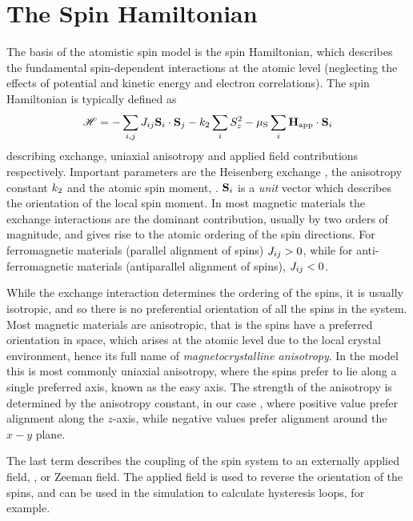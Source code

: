 \section*{The Spin Hamiltonian}
The basis of the atomistic spin model is the spin Hamiltonian, which describes the fundamental spin-dependent interactions at the atomic level (neglecting the effects of potential and kinetic energy and electron correlations). The spin Hamiltonian is typically defined as 
\begin{equation*}
\mathscr{H} = - \sum_{i,j} J_{ij} \mathbf{S}_i \cdot \mathbf{S}_j - k_{2} \sum_{i} S_z^2 - \mu_\mathrm{S} \sum_i \mathbf{H}_{\mathrm{app}} \cdot \mathbf{S}_i
\end{equation*}
describing exchange, uniaxial anisotropy and applied field contributions respectively. Important parameters are the Heisenberg exchange \Jij, the anisotropy constant $k_{2}$ and the atomic spin moment, \smmu. $\mathbf{S}_i$ is a \textit{unit} vector which describes the orientation of the local spin moment. In most magnetic materials the exchange interactions are the dominant contribution, usually by two orders of magnitude, and gives rise to the atomic ordering of the spin directions. For ferromagnetic materials (parallel alignment of spins) $J_{ij} > 0$, while for anti-ferromagnetic materials (antiparallel alignment of spins), $J_{ij} < 0$. 

While the exchange interaction determines the ordering of the spins, it is usually isotropic, and so there is no preferential orientation of all the spins in the system. Most magnetic materials are anisotropic, that is the spins have a preferred orientation in space, which arises at the atomic level due to the local crystal environment, hence its full name of \textit{magnetocrystalline anisotropy}. In the model this is most commonly uniaxial anisotropy, where the spins prefer to lie along a single preferred axis, known as the easy axis. The strength of the anisotropy is determined by the anisotropy constant, in our case \kuu, where positive value prefer alignment along the $z$-axis, while negative values prefer alignment around the $x-y$ plane. 

The last term describes the coupling of the spin system to an externally applied field, \Happ, or Zeeman field. The applied field is used to reverse the orientation of the spins, and can be used in the simulation to calculate hysteresis loops, for example.


